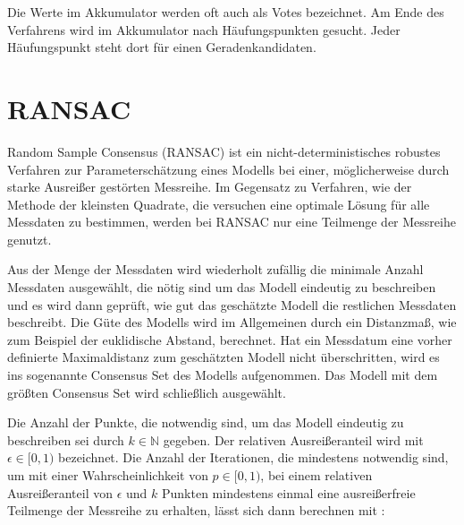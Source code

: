 Die Werte im Akkumulator werden oft auch als Votes bezeichnet. Am Ende des Verfahrens wird im Akkumulator nach Häufungspunkten gesucht. Jeder Häufungspunkt steht dort für einen Geradenkandidaten.




\section{RANSAC}
\label{s:ransac}
Random Sample Consensus (RANSAC) \cite{Fischler1981} ist ein nicht-deterministisches robustes Verfahren zur Parameterschätzung eines Modells bei einer, möglicherweise durch starke Ausreißer gestörten Messreihe.
Im Gegensatz zu Verfahren, wie der Methode der kleinsten Quadrate, die versuchen eine optimale Lösung für alle Messdaten zu bestimmen, werden bei RANSAC nur eine Teilmenge der Messreihe genutzt.

Aus der Menge der Messdaten wird wiederholt zufällig die minimale Anzahl Messdaten ausgewählt, die nötig sind um das Modell eindeutig zu beschreiben und es wird dann geprüft, wie gut das geschätzte Modell die restlichen Messdaten beschreibt.
Die Güte des Modells wird im Allgemeinen durch ein Distanzmaß, wie zum Beispiel der euklidische Abstand, berechnet.
Hat ein Messdatum eine vorher definierte Maximaldistanz zum geschätzten Modell nicht überschritten, wird es ins sogenannte Consensus Set des Modells aufgenommen.
Das Modell mit dem größten Consensus Set wird schließlich ausgewählt.

Die Anzahl der Punkte, die notwendig sind, um das Modell eindeutig zu beschreiben sei durch $k\in\mathbb{N}$ gegeben. Der relativen Ausreißeranteil wird mit $\epsilon \in[0,1)$ bezeichnet.
Die Anzahl der Iterationen, die mindestens notwendig sind, um mit einer Wahrscheinlichkeit von $p \in [0,1)$, bei einem relativen Ausreißeranteil von $\epsilon$ und $k$ Punkten mindestens einmal eine ausreißerfreie Teilmenge der Messreihe zu erhalten, lässt sich dann berechnen mit \cite{Fischler1981}:


